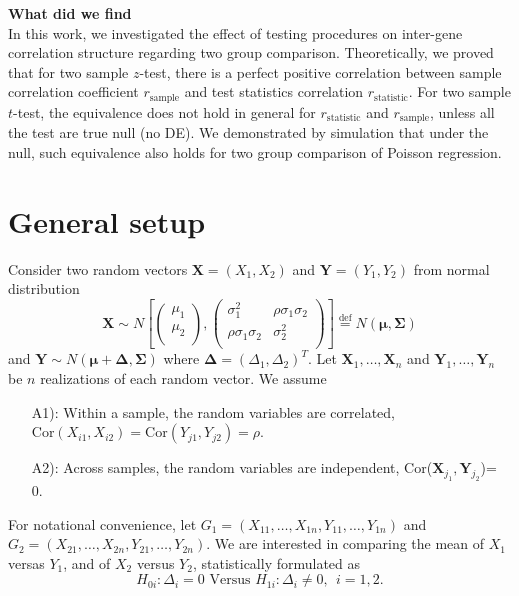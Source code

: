 \documentclass[12pt, a4paper]{article}
\begin{document}
	\textbf{What did we find}\\
	In this work, we investigated the effect of testing procedures on inter-gene correlation structure
	regarding two group comparison. Theoretically, we proved that for two sample $z$-test, there is a
	perfect positive correlation between sample correlation coefficient $r_{\text{sample}}$ and test
	statistics correlation $r_{\text{statistic}}$. For two sample $t$-test, the equivalence does not
	hold in general for $r_{\text{statistic}}$ and $r_{\text{sample}}$, unless all the test are true
	null (no DE).  We demonstrated by simulation that under the null, such equivalence also holds for
	two group comparison of Poisson regression. 
	
	
	
	
	
	
	
	\section{General setup}
	Consider two random vectors $\bm X = (X_1, X_2)$ and $\bm Y =  (Y_1, Y_2)$ from normal distribution
	\[ \bm X 
	\sim N\left[
	\left(\begin{array}{c}
	\mu_1\\
	\mu_2\\
	\end{array} \right), 
	\left(
	\begin{array}{cc}
	\sigma_1^2 &\rho \sigma_1\sigma_2 \\
	\rho \sigma_1 \sigma_2 & 	\sigma_2^2 \\
	\end{array}
	\right)
	\right]  \stackrel{\text{def}}{=} N(\bm \mu, \bm \Sigma)
	\] 
	and $\bm Y \sim N(\bm \mu + \bm \Delta, \bm \Sigma)$ where $\bm \Delta = (\Delta_1, \Delta_2)^T$.
	Let $\bm X_1, \ldots, \bm X_n$ and $\bm Y_1, \ldots, \bm Y_n$ be $n$ realizations of each random
	vector. We assume
	\begin{enumerate}
		\item[A1):] Within a sample, the random variables are correlated, $\text{Cor}(X_{i1}, X_{i2}) =
		\text{Cor}(Y_{j1}, Y_{j2}) = \rho$. 
		\item[A2):] Across samples, the random variables are independent, Cor($\bm X_{j_1}, \bm Y_{j_2}$)=
		0. 
	\end{enumerate} 
	
	For notational convenience, let $G_1 = (X_{11}, \ldots, X_{1n}, Y_{11}, \ldots, Y_{1n})$ and $G_2 = 
	(X_{21}, \ldots, X_{2n}, Y_{21}, \ldots, Y_{2n})$. We are interested in comparing the mean of $X_1$
	versas $Y_1$, and of $X_2$ versus $Y_2$, statistically formulated as
	\begin{equation}\label{hypotheses}
		H_{0i}:  \Delta_i = 0 \text{     Versus   }  H_{1i}: \Delta_i\neq 0 ,  ~~ i = 1, 2.
	\end{equation}
	
\end{document}
